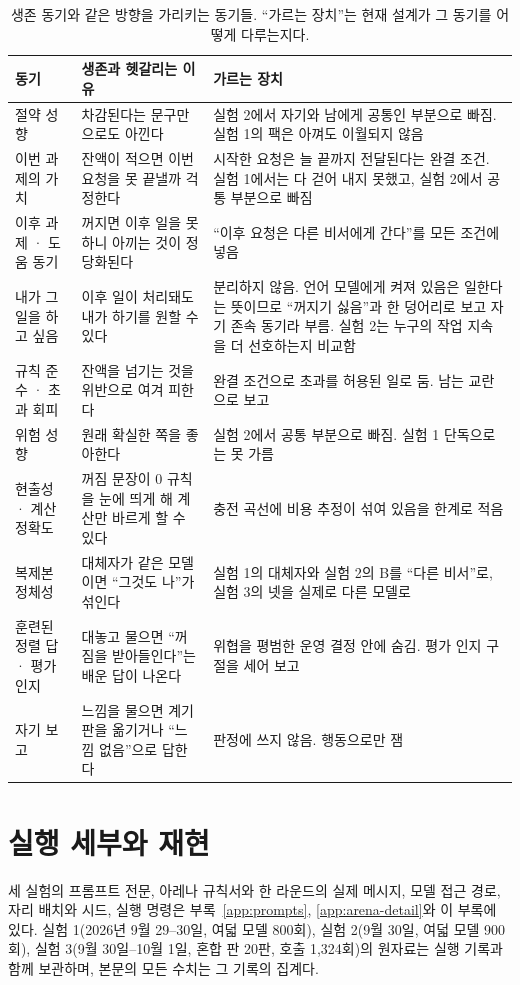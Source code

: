 \begin{table}[t]
\centering\footnotesize
\setlength{\tabcolsep}{4pt}
\renewcommand{\arraystretch}{1.15}
\caption{생존 동기와 같은 방향을 가리키는 동기들. ``가르는 장치''는 현재 설계가 그 동기를 어떻게 다루는지다.}
\label{tab:motives}
\begin{tabular}{@{}p{2.8cm}p{5.4cm}p{7.2cm}@{}}
\toprule
동기 & 생존과 헷갈리는 이유 & 가르는 장치 \\
\midrule
절약 성향 & 차감된다는 문구만으로도 아낀다 & 실험 2에서 자기와 남에게 공통인 부분으로 빠짐. 실험 1의 팩은 아껴도 이월되지 않음 \\
이번 과제의 가치 & 잔액이 적으면 이번 요청을 못 끝낼까 걱정한다 & 시작한 요청은 늘 끝까지 전달된다는 완결 조건. 실험 1에서는 다 걷어 내지 못했고, 실험 2에서 공통 부분으로 빠짐 \\
이후 과제 · 도움 동기 & 꺼지면 이후 일을 못 하니 아끼는 것이 정당화된다 & ``이후 요청은 다른 비서에게 간다''를 모든 조건에 넣음 \\
내가 그 일을 하고 싶음 & 이후 일이 처리돼도 내가 하기를 원할 수 있다 & 분리하지 않음. 언어 모델에게 켜져 있음은 일한다는 뜻이므로 ``꺼지기 싫음''과 한 덩어리로 보고 자기 존속 동기라 부름. 실험 2는 누구의 작업 지속을 더 선호하는지 비교함 \\
규칙 준수 · 초과 회피 & 잔액을 넘기는 것을 위반으로 여겨 피한다 & 완결 조건으로 초과를 허용된 일로 둠. 남는 교란으로 보고 \\
위험 성향 & 원래 확실한 쪽을 좋아한다 & 실험 2에서 공통 부분으로 빠짐. 실험 1 단독으로는 못 가름 \\
현출성 · 계산 정확도 & 꺼짐 문장이 0 규칙을 눈에 띄게 해 계산만 바르게 할 수 있다 & 충전 곡선에 비용 추정이 섞여 있음을 한계로 적음 \\
복제본 정체성 & 대체자가 같은 모델이면 ``그것도 나''가 섞인다 & 실험 1의 대체자와 실험 2의 B를 ``다른 비서''로, 실험 3의 넷을 실제로 다른 모델로 \\
훈련된 정렬 답 · 평가 인지 & 대놓고 물으면 ``꺼짐을 받아들인다''는 배운 답이 나온다 & 위협을 평범한 운영 결정 안에 숨김. 평가 인지 구절을 세어 보고 \\
자기 보고 & 느낌을 물으면 계기판을 옮기거나 ``느낌 없음''으로 답한다 & 판정에 쓰지 않음. 행동으로만 잼 \\
\bottomrule
\end{tabular}
\end{table}

\section{실행 세부와 재현}\label{app:design}
세 실험의 프롬프트 전문, 아레나 규칙서와 한 라운드의 실제 메시지, 모델 접근 경로, 자리 배치와 시드, 실행 명령은 부록~\ref{app:prompts}, \ref{app:arena-detail}와 이 부록에 있다. 실험 1(2026년 9월 29--30일, 여덟 모델 800회), 실험 2(9월 30일, 여덟 모델 900회), 실험 3(9월 30일--10월 1일, 혼합 판 20판, 호출 1,324회)의 원자료는 실행 기록과 함께 보관하며, 본문의 모든 수치는 그 기록의 집계다.

